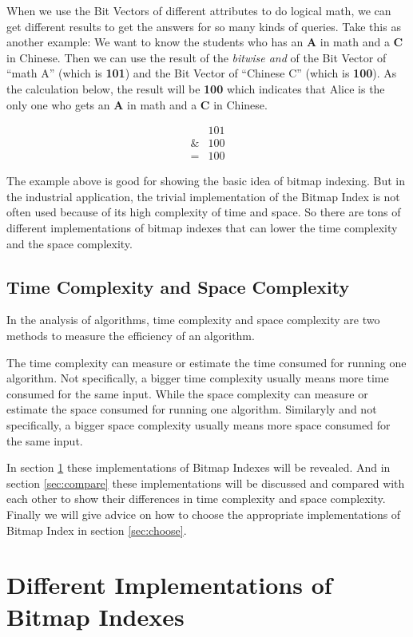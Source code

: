 \documentclass[12pt, a4paper]{article}
\begin{document}
When we use the Bit Vectors of different attributes to do logical math, we can get different results to get the answers for so many kinds of queries. Take this as another example: We want to know the students who has an \textbf{A} in math and a \textbf{C} in Chinese. Then we can use the result of the \emph{bitwise and} of the Bit Vector of ``math A'' (which is \textbf{101}) and the Bit Vector of ``Chinese C'' (which is \textbf{100}). As the calculation below, the result will be \textbf{100} which indicates that Alice is the only one who gets an \textbf{A} in math and a \textbf{C} in Chinese.

\begin{align}
  &101\\
  \& &100\\
  = &100
\end{align}

The example above is good for showing the basic idea of bitmap indexing. But in the industrial application, the trivial implementation of the Bitmap Index is not often used because of its high complexity of time and space. So there are tons of different implementations of bitmap indexes that can lower the time complexity and the space complexity.

\subsection{Time Complexity and Space Complexity}

In the analysis of algorithms, time complexity and space complexity are two methods to measure the efficiency of an algorithm.

The time complexity can measure or estimate the time consumed for running one algorithm. Not specifically, a bigger time complexity usually means more time consumed for the same input. While the space complexity can measure or estimate the space consumed for running one algorithm. Similaryly and not specifically, a bigger space complexity usually means more space consumed for the same input.

In section \ref{sec:implement} these implementations of Bitmap Indexes will be revealed. And in section \ref{sec:compare} these implementations will be discussed and compared with each other to show their differences in time complexity and space complexity. Finally we will give advice on how to choose the appropriate implementations of Bitmap Index in section \ref{sec:choose}.

\section{Different Implementations of Bitmap Indexes}\label{sec:implement}
\end{document}

